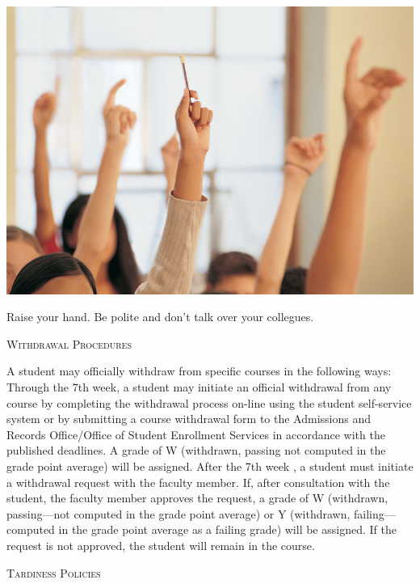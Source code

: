 \documentclass{tufte-handout}
\begin{document}
\begin{marginfigure}%
  \includegraphics[width=\linewidth]{../assets/raisinghands.jpg}
  \caption{Raise your hand. Be polite and don't talk over your collegues.}
  \label{fig:marginfig}
\end{marginfigure}

\begin{center}
\textsc{Withdrawal Procedures}
\end{center}

A student may officially withdraw from specific courses in the following ways: Through the 7th week, a student may initiate an official withdrawal from any course by completing the withdrawal process on-line using the student self-service system or by submitting a course withdrawal form to the Admissions and Records Office/Office of Student Enrollment Services in accordance with the published deadlines. A grade of W (withdrawn, passing not computed in the grade point average) will be assigned. After the 7th week , a student must initiate a withdrawal request with the faculty member. If, after consultation with the student, the faculty member approves the request, a grade of W (withdrawn, passing---not computed in the grade point average) or Y (withdrawn,
failing---computed in the grade point average as a failing grade) will be assigned. If the request is not approved, the student will remain in the course.

\vspace{0.7in}

\begin{center}
\textsc{Tardiness Policies}
\end{center}
\end{document}
